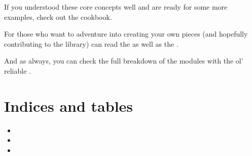 \documentclass[letterpaper,10pt,english]{sphinxmanual}
\begin{document}
If you understood these core concepts well and are ready for some more examples, check out the cookbook.

For those who want to adventure into creating your own pieces (and hopefully contributing to the library) can read the {\hyperref[\detokenize{developers-guide:developers-guide}]{}} as well as the .

And as always, you can check the full breakdown of the modules with the ol’ reliable {\hyperref[\detokenize{modules:modules}]{}}.


\chapter{Indices and tables}
\label{\detokenize{index:indices-and-tables}}\label{\detokenize{index:id4}}\begin{itemize}
\item {} 

\item {} 

\item {} 

\end{itemize}
\end{document}
